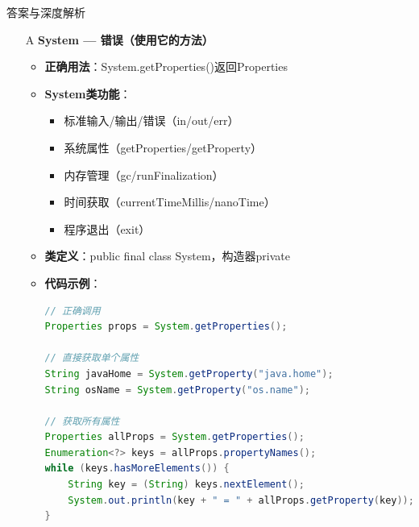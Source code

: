 \documentclass[12pt, a4paper]{ctexart}
\begin{document}
\begin{enumerate}[label=\textbf{\arabic*.}]
\begin{bluebox}{答案与深度解析}
		      \begin{itemize}[leftmargin=*, nosep, label={}]
			      \item[A] \textbf{System — 错误（使用它的方法）}
			            \begin{itemize}[label={}, leftmargin=*, nosep]
				            \item \textbf{正确用法}：System.getProperties()返回Properties
				            \item \textbf{System类功能}：
				                  \begin{itemize}[label={}, nosep]
					                  \item 标准输入/输出/错误（in/out/err）
					                  \item 系统属性（getProperties/getProperty）
					                  \item 内存管理（gc/runFinalization）
					                  \item 时间获取（currentTimeMillis/nanoTime）
					                  \item 程序退出（exit）
				                  \end{itemize}
				            \item \textbf{类定义}：public final class System，构造器private
				            \item \textbf{代码示例}：
				                  \begin{lstlisting}[language=Java]
// 正确调用
Properties props = System.getProperties();

// 直接获取单个属性
String javaHome = System.getProperty("java.home");
String osName = System.getProperty("os.name");

// 获取所有属性
Properties allProps = System.getProperties();
Enumeration<?> keys = allProps.propertyNames();
while (keys.hasMoreElements()) {
    String key = (String) keys.nextElement();
    System.out.println(key + " = " + allProps.getProperty(key));
}
				            \end{lstlisting}
			            \end{itemize}


\end{itemize}
\end{bluebox}
\end{enumerate}
\end{document}
